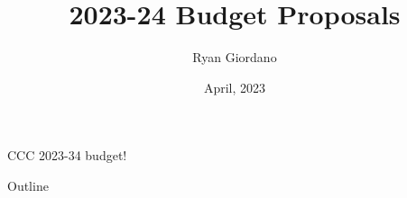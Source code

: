 \documentclass[8pt]{beamer}
\title{2023-24 Budget Proposals}
\author{Ryan Giordano}
\date{April, 2023}
\institute{Children's Community Center}
\begin{document}
\def\subitem#1{\begin{itemize}\item #1\end{itemize}}



\begin{frame}{}
    \begin{center}
    {\Large CCC 2023-34 budget!}
\end{center}
\end{frame}

\begin{frame}{Outline}


\end{frame}
\end{document}
